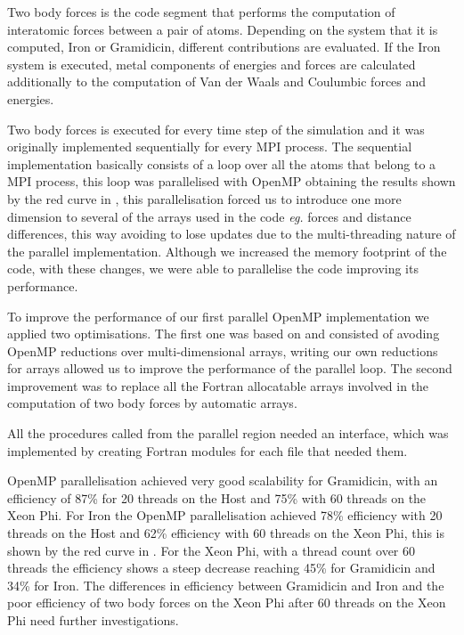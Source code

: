 \par{Two body forces is the code segment that performs the computation of interatomic forces between a pair of atoms. Depending 
on the system that it is computed, Iron or Gramidicin, different contributions are evaluated. If the Iron system is executed, 
metal components of energies and forces are calculated additionally to the computation of Van der Waals and Coulumbic forces and 
energies.}

\par{Two body forces is executed for every time step of the simulation and it was originally implemented sequentially for every MPI 
process. The sequential implementation basically consists of a loop over all the atoms that belong to a MPI process, this loop was 
parallelised with OpenMP obtaining the results shown by the red curve in , this parallelisation forced us to 
introduce one more dimension to several of the arrays used in the code \emph{eg.} forces and distance differences, this way 
avoiding to lose updates due to the multi-threading nature of the parallel implementation. Although we increased the memory 
footprint of the code, with these changes, we were able to parallelise the code improving its performance.}

\par{To improve the performance of our first parallel OpenMP implementation we applied two optimisations. The first one was based 
on \citep{Meloni2003} and consisted of avoding OpenMP reductions over multi-dimensional arrays, writing our own reductions 
for arrays allowed us to improve the performance of the parallel loop. The second improvement was to replace all 
the Fortran allocatable arrays involved in the computation of two body forces by automatic arrays.}

\par{All the procedures called from the parallel region needed an interface, which was implemented by creating Fortran modules
for each file that needed them.}

\par{OpenMP parallelisation achieved very good scalability for Gramidicin, with an efficiency of 87\% for 20 threads on the Host
and 75\% with 60 threads on the Xeon Phi. For Iron the OpenMP parallelisation achieved 78\% efficiency with 20 threads on the 
Host and 62\% efficiency with 60 threads on the Xeon Phi, this is shown by the red curve in . For the Xeon Phi, 
with a thread count over 60 threads the efficiency shows a steep decrease reaching 45\% for Gramidicin and 34\% for Iron. The 
differences in efficiency between Gramidicin and Iron and the poor efficiency of two body forces on the Xeon Phi after 60 threads
on the Xeon Phi need further investigations.}

